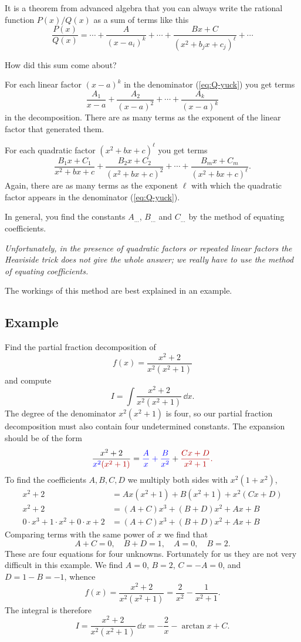It is a theorem from advanced algebra that you can always write the rational
function $P(x)/Q(x)$ as a sum of terms like this
\begin{equation}
  \label{eq:yuck-decomposed}
  \frac{P(x)}{Q(x)} =
  \cdots+\frac{A}{(x-a_i)^k}+\cdots+\frac{Bx+C}{(x^2+b_jx+c_j)^\ell}+\cdots
\end{equation}

How did this sum come about?

For each linear factor $(x-a)^{k}$ in the denominator (\ref{eq:Q-yuck}) you get
terms
\[
\frac{A_1}{x-a}+\frac{A_2}{(x-a)^2}+\cdots+\frac{A_k}{(x-a)^k}
\]
in the decomposition. There are as many terms as the exponent of the linear
factor that generated them.

For each quadratic factor $(x^2+bx+c)^\ell$ you get terms
\[
\frac{B_1x+C_1}{x^2+bx+c}+\frac{B_2x+C_2}{(x^2+bx+c)^2}+\cdots
+\frac{B_mx+C_m}{(x^2+bx+c)^\ell}.
\]
Again, there are as many terms as the exponent $\ell$ with which the quadratic
factor appears in the denominator (\ref{eq:Q-yuck}).

In general, you find the constants $A_{\ldots}$, $B_{\ldots}$ and $C_{\ldots}$
by the method of equating coefficients.

\medskip\noindent {\Large \textdbend }\hfill\parbox[b]{4in}{\itshape
  Unfortunately, in the presence of quadratic factors or repeated linear factors
  the Heaviside trick does not give the whole answer; we really have to use the
  method of equating coefficients.}\hfill{\Large \textdbend } \medskip

The workings of this method are best explained in an example.

\subsection{Example} %
Find the partial fraction decomposition of
\[
f(x) = \frac{x^2+2} {x^2(x^2+1)}
\]
and compute
\[
I = \int \frac{x^2+2} {x^2(x^2+1)} \, \dd x.
\]
The degree of the denominator $x^2(x^2+1)$ is four, so our partial fraction
decomposition must also contain four undetermined constants.  The expansion
should be of the form
\[
\frac{x^2+2} {\color{blue}x^2\color{badgerred}(x^2+1)} = \color{blue}\frac{A}
{x} +\frac{B} {x^2} \color{black}+ \color{badgerred} \frac{Cx+D} {x^2+1}.
\]
To find the coefficients $A,B,C,D$ we multiply both sides with $x^2(1+x^2)$,
\begin{align*}
  x^2+2 &= A x(x^2+1) + B(x^2+1) + x^2(Cx+D)\\
  x^2+2 &= (A+C)x^3 + (B+D)x^2 + Ax + B \\
  0\cdot x^3+ 1\cdot x^2+0\cdot x+2 &= (A+C)x^3 + (B+D)x^2 + Ax + B
\end{align*}
Comparing terms with the same power of $x$ we find that
\[
A+C = 0, \quad B+D = 1, \quad A = 0, \quad B=2.
\]
These are four equations for four unknowns.  Fortunately for us they are not
very difficult in this example.  We find $A=0$, $B=2$, $C=-A=0$, and $D=1-B =
-1$, whence
\[
f(x) = \frac{x^2+2} {x^2(x^2+1)} = \frac{2} {x^2} - \frac{1} {x^2+1}.
\]
The integral is therefore
\[
I = \frac{x^2+2} {x^2(x^2+1)} \,\dd x =-\frac{2} {x} - \arctan x +C.
\]
